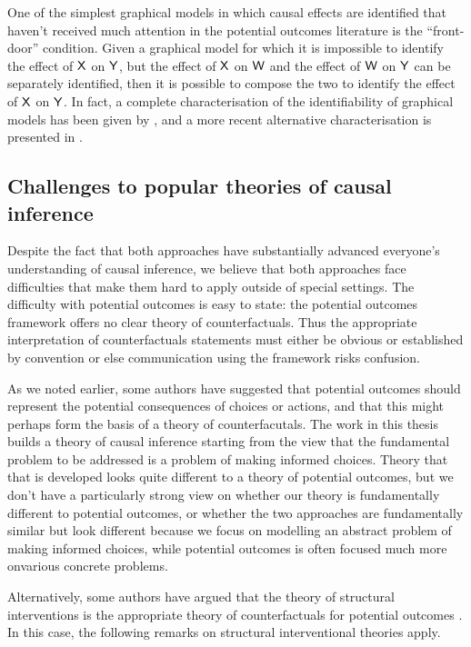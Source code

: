 One of the simplest graphical models in which causal effects are identified that haven't received much attention in the potential outcomes literature is the ``front-door'' condition. Given a graphical model for which it is impossible to identify the effect of $\mathsf{X}$ on $\mathsf{Y}$, but the effect of $\mathsf{X}$ on $\mathsf{W}$ and the effect of $\mathsf{W}$ on $\mathsf{Y}$ can be separately identified, then it is possible to compose the two to identify the effect of $\mathsf{X}$ on $\mathsf{Y}$\citet[Section 3.3.2]{pearl_causality:_2009}. In fact, a complete characterisation of the identifiability of graphical models has been given by \citet{shpitser_complete_2008}, and a more recent alternative characterisation is presented in \citet{richardson_nested_2017}.   

\subsection{Challenges to popular theories of causal inference}

Despite the fact that both approaches have substantially advanced everyone's understanding of causal inference, we believe that both approaches face difficulties that make them hard to apply outside of special settings. The difficulty with potential outcomes is easy to state: the potential outcomes framework offers no clear theory of counterfactuals. Thus the appropriate interpretation of counterfactuals statements must either be obvious or established by convention or else communication using the framework risks confusion. 

As we noted earlier, some authors have suggested that potential outcomes should represent the potential consequences of choices or actions, and that this might perhaps form the basis of a theory of counterfacutals. The work in this thesis builds a theory of causal inference starting from the view that the fundamental problem to be addressed is a problem of making informed choices. Theory that that is developed looks quite different to a theory of potential outcomes, but we don't have a particularly strong view on whether our theory is fundamentally different to potential outcomes, or whether the two approaches are fundamentally similar but look different because we focus on modelling an abstract problem of making informed choices, while potential outcomes is often focused much more onvarious concrete problems.

Alternatively, some authors have argued that the theory of structural interventions is the appropriate theory of counterfactuals for potential outcomes \citep[chap. ~7]{pearl_causality:_2009}. In this case, the following remarks on structural interventional theories apply.

